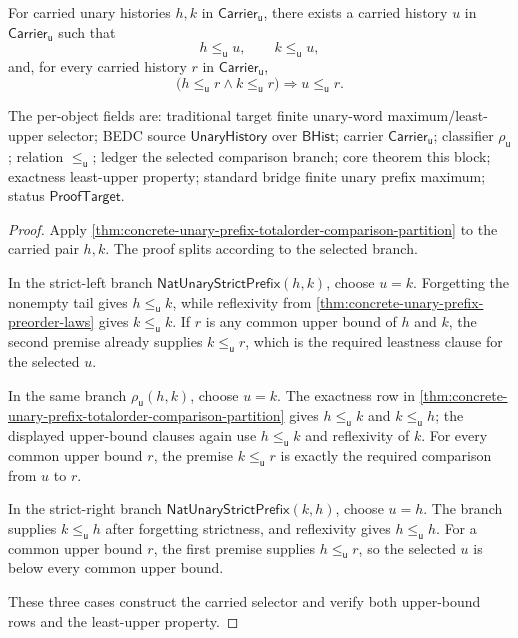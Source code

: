 \begin{theorem}
\label{thm:totalorder-prefix-least-upper-selector}
For carried unary histories $h,k$ in $\mathsf{Carrier}_{\mathsf{u}}$, there
exists a carried history $u$ in $\mathsf{Carrier}_{\mathsf{u}}$ such that
$$
h\le_{\mathsf{u}}u,
\qquad
k\le_{\mathsf{u}}u,
$$
and, for every carried history $r$ in $\mathsf{Carrier}_{\mathsf{u}}$,
$$
\bigl(h\le_{\mathsf{u}}r\land k\le_{\mathsf{u}}r\bigr)
\Rightarrow u\le_{\mathsf{u}}r.
$$

The per-object fields are: traditional target finite unary-word
maximum/least-upper selector; BEDC source $\mathsf{UnaryHistory}$ over
$\mathsf{BHist}$; carrier $\mathsf{Carrier}_{\mathsf{u}}$; classifier
$\rho_{\mathsf{u}}$; relation $\le_{\mathsf{u}}$; ledger the selected
comparison branch; core theorem this block; exactness least-upper property;
standard bridge finite unary prefix maximum; status $\mathsf{ProofTarget}$.
\end{theorem}
\begin{proof}
Apply
\autoref{thm:concrete-unary-prefix-totalorder-comparison-partition} to the
carried pair $h,k$. The proof splits according to the selected branch.

In the strict-left branch $\mathsf{NatUnaryStrictPrefix}(h,k)$, choose $u=k$.
Forgetting the nonempty tail gives $h\le_{\mathsf{u}}k$, while reflexivity from
\autoref{thm:concrete-unary-prefix-preorder-laws} gives
$k\le_{\mathsf{u}}k$. If $r$ is any common upper bound of $h$ and $k$, the
second premise already supplies $k\le_{\mathsf{u}}r$, which is the required
leastness clause for the selected $u$.

In the same branch $\rho_{\mathsf{u}}(h,k)$, choose $u=k$. The exactness row in
\autoref{thm:concrete-unary-prefix-totalorder-comparison-partition} gives
$h\le_{\mathsf{u}}k$ and $k\le_{\mathsf{u}}h$; the displayed upper-bound clauses
again use $h\le_{\mathsf{u}}k$ and reflexivity of $k$. For every common upper
bound $r$, the premise $k\le_{\mathsf{u}}r$ is exactly the required comparison
from $u$ to $r$.

In the strict-right branch $\mathsf{NatUnaryStrictPrefix}(k,h)$, choose $u=h$.
The branch supplies $k\le_{\mathsf{u}}h$ after forgetting strictness, and
reflexivity gives $h\le_{\mathsf{u}}h$. For a common upper bound $r$, the first
premise supplies $h\le_{\mathsf{u}}r$, so the selected $u$ is below every common
upper bound.

These three cases construct the carried selector and verify both upper-bound
rows and the least-upper property.
\end{proof}
